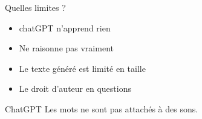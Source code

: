 \begin{frame}{Quelles limites ?}
  \begin{itemize}
    \item chatGPT n'apprend rien 
    \item Ne raisonne pas vraiment
    \item Le texte généré est limité en taille
    \item Le droit d'auteur en questions
  \end{itemize} 
\end{frame}

\begin{frame}{ChatGPT}
  Les mots ne sont pas attachés à des sons.
\end{frame}
